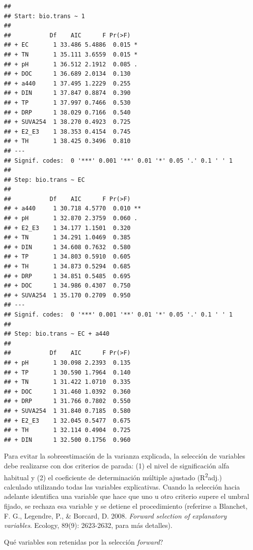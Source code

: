 \documentclass[
]{book}
\newenvironment{Shaded}{\begin{snugshade}}{\end{snugshade}}
\newcommand{\NormalTok}[1]{#1}
\newcommand{\SpecialCharTok}[1]{\textcolor[rgb]{0.00,0.00,0.00}{#1}}
\begin{document}
\begin{verbatim}
## 
## Start: bio.trans ~ 1 
## 
##           Df    AIC      F Pr(>F)  
## + EC       1 33.486 5.4886  0.015 *
## + TN       1 35.111 3.6559  0.015 *
## + pH       1 36.512 2.1912  0.085 .
## + DOC      1 36.689 2.0134  0.130  
## + a440     1 37.495 1.2229  0.255  
## + DIN      1 37.847 0.8874  0.390  
## + TP       1 37.997 0.7466  0.530  
## + DRP      1 38.029 0.7166  0.540  
## + SUVA254  1 38.270 0.4923  0.725  
## + E2_E3    1 38.353 0.4154  0.745  
## + TH       1 38.425 0.3496  0.810  
## ---
## Signif. codes:  0 '***' 0.001 '**' 0.01 '*' 0.05 '.' 0.1 ' ' 1
## 
## Step: bio.trans ~ EC 
## 
##           Df    AIC      F Pr(>F)   
## + a440     1 30.718 4.5770  0.010 **
## + pH       1 32.870 2.3759  0.060 . 
## + E2_E3    1 34.177 1.1501  0.320   
## + TN       1 34.291 1.0469  0.385   
## + DIN      1 34.608 0.7632  0.580   
## + TP       1 34.803 0.5910  0.605   
## + TH       1 34.873 0.5294  0.685   
## + DRP      1 34.851 0.5485  0.695   
## + DOC      1 34.986 0.4307  0.750   
## + SUVA254  1 35.170 0.2709  0.950   
## ---
## Signif. codes:  0 '***' 0.001 '**' 0.01 '*' 0.05 '.' 0.1 ' ' 1
## 
## Step: bio.trans ~ EC + a440 
## 
##           Df    AIC      F Pr(>F)
## + pH       1 30.098 2.2393  0.135
## + TP       1 30.590 1.7964  0.140
## + TN       1 31.422 1.0710  0.335
## + DOC      1 31.460 1.0392  0.360
## + DRP      1 31.766 0.7802  0.550
## + SUVA254  1 31.840 0.7185  0.580
## + E2_E3    1 32.045 0.5477  0.675
## + TH       1 32.114 0.4904  0.725
## + DIN      1 32.500 0.1756  0.960
\end{verbatim}

Para evitar la sobreestimación de la varianza explicada, la selección de variables debe realizarse con dos criterios de parada: (1) el nivel de significación alfa habitual y (2) el coeficiente de determinación múltiple ajustado (R\textsuperscript{2}adj.) calculado utilizando todas las variables explicativas. Cuando la selección hacia adelante identifica una variable que hace que uno u otro criterio supere el umbral fijado, se rechaza esa variable y se detiene el procedimiento (referirse a Blanchet, F. G., Legendre, P., \& Borcard, D. 2008. \emph{Forward selection of explanatory variables}. Ecology, 89(9): 2623-2632, para más detalles).

Qué variables son retenidas por la selección \emph{forward}?

\begin{Shaded}
\end{Shaded}
\end{document}
